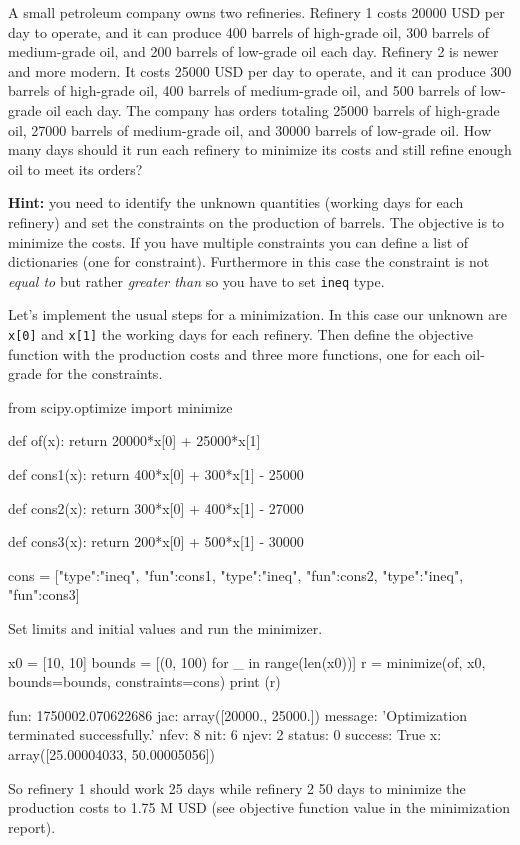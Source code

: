 \begin{question}
A small petroleum company owns two refineries. Refinery 1 costs 20000 USD per day to operate, and it can produce 400 barrels of high-grade oil, 300 barrels of medium-grade oil, and 200 barrels of low-grade oil each day. Refinery 2 is newer and more modern. It costs 25000 USD per day to operate, and it can produce 300 barrels of high-grade oil, 400 barrels of medium-grade oil, and 500 barrels of low-grade oil each day.
The company has orders totaling 25000 barrels of high-grade oil, 27000 barrels of medium-grade oil, and 30000 barrels of low-grade oil. How many days should it run each refinery to minimize its costs and still refine enough oil to meet its orders?

\noindent\textbf{Hint:} you need to identify the unknown quantities (working days for each refinery) and set the constraints on the production of barrels. The objective is to minimize the costs. If you have multiple constraints you can define a list of dictionaries (one for constraint). Furthermore in this case the constraint is not \emph{equal to} but rather \emph{greater than} so you have to set \texttt{ineq} type.
\end{question}

\cprotEnv\begin{solution}
Let's implement the usual steps for a minimization. In this case our unknown are \texttt{x[0]} and \texttt{x[1]} the working days for each refinery. Then define the objective function with the production costs and three more functions, one for each oil-grade for the constraints.

\begin{ipython}
from scipy.optimize import minimize

def of(x):
    return 20000*x[0] + 25000*x[1]

def cons1(x):
    return 400*x[0] + 300*x[1] - 25000

def cons2(x):
    return 300*x[0] + 400*x[1] - 27000

def cons3(x):
    return 200*x[0] + 500*x[1] - 30000

cons = [{"type":"ineq", "fun":cons1},
        {"type":"ineq", "fun":cons2},
        {"type":"ineq", "fun":cons3}]
\end{ipython}
Set limits and initial values and run the minimizer.
\begin{ipython}
x0 = [10, 10]
bounds = [(0, 100) for _ in range(len(x0))]
r = minimize(of, x0, bounds=bounds, constraints=cons)
print (r)
\end{ipython}
\begin{ioutput}
     fun: 1750002.070622686
     jac: array([20000., 25000.])
 message: 'Optimization terminated successfully.'
    nfev: 8
     nit: 6
    njev: 2
  status: 0
 success: True
       x: array([25.00004033, 50.00005056])
\end{ioutput}    
So refinery 1 should work 25 days while refinery 2 50 days to minimize the production costs to 1.75 M USD (see objective function value in the minimization report).
\end{solution}

